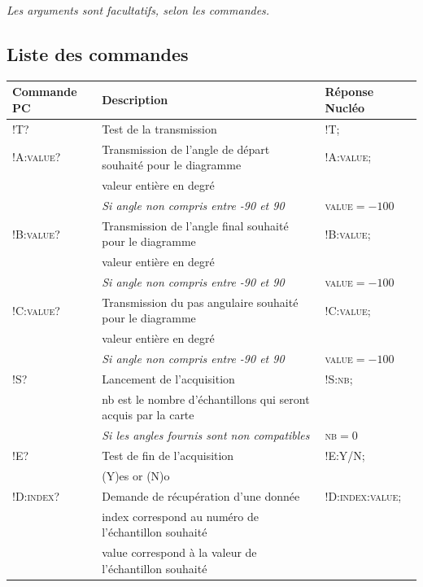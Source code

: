 \documentclass[a4paper,11pt,titlepage]{article} %
\begin{document}
\textit{Les arguments sont facultatifs, selon les commandes.}


\subsection{Liste des commandes}

\begin{center}

\begin{tabular}{|l|l|l|}
\hline 
\textbf{Commande PC} & Description & \textbf{Réponse Nucléo} \\ 
\hline 
\textsc{!T?} & Test de la transmission & \textsc{!T;} \\ 
\hline 
\textsc{!A:value?} & Transmission de l'angle de départ souhaité pour le diagramme & \textsc{!A:value;} \\ 
 &  valeur entière en degré &  \\
 & \textit{Si angle non compris entre -90 et 90} & \textsc{value}$ = -100$ \\ 
\hline 
\textsc{!B:value?} & Transmission de l'angle final souhaité pour le diagramme & \textsc{!B:value;} \\ 
 &  valeur entière en degré &  \\ 
 & \textit{Si angle non compris entre -90 et 90} & \textsc{value}$ = -100$ \\
\hline 
\textsc{!C:value?} & Transmission du pas angulaire souhaité pour le diagramme & \textsc{!C:value;} \\ 
 &  valeur entière en degré &  \\ 
 & \textit{Si angle non compris entre -90 et 90} & \textsc{value}$ = -100$ \\
\hline 
\textsc{!S?} & Lancement de l'acquisition & \textsc{!S:nb;} \\ 
 &  nb est le nombre d'échantillons qui seront acquis par la carte &  \\ 
 & \textit{Si les angles fournis sont non compatibles} & \textsc{nb}$ = 0$ \\
\hline 
\textsc{!E?} & Test de fin de l'acquisition & \textsc{!E:Y/N;} \\
 &  (Y)es or (N)o &  \\  
\hline 
\textsc{!D:index?} & Demande de récupération d'une donnée & \textsc{!D:index:value;} \\
 &  index correspond au numéro de l'échantillon souhaité &  \\  
 &  value correspond à la valeur de l'échantillon souhaité &  \\  
\hline 
\end{tabular} 

\end{center}
\end{document}
